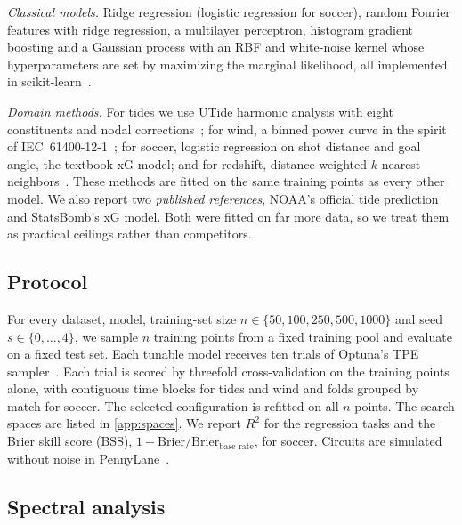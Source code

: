 \documentclass[11pt,letterpaper]{article}
\begin{document}
\emph{Classical models.} Ridge regression (logistic regression for soccer), random Fourier
features with ridge regression, a multilayer perceptron, histogram gradient boosting and a
Gaussian process with an RBF and white-noise kernel whose hyperparameters are set by maximizing
the marginal likelihood, all implemented in scikit-learn~\cite{pedregosa2011sklearn}.

\emph{Domain methods.} For tides we use UTide harmonic analysis with eight constituents and
nodal corrections~\cite{codiga2011utide}; for wind, a binned power curve in the spirit of
IEC~61400-12-1~\cite{iec61400}; for soccer, logistic regression on shot distance and goal
angle, the textbook xG model; and for redshift, distance-weighted $k$-nearest
neighbors~\cite{beck2016photoz}. These methods are fitted on the same training points as every
other model. We also report two \emph{published references}, NOAA's official tide prediction
and StatsBomb's xG model. Both were fitted on far more data, so we treat them as practical
ceilings rather than competitors.

\subsection{Protocol}

For every dataset, model, training-set size $n\in\{50,100,250,500,1000\}$ and seed
$s\in\{0,\dots,4\}$, we sample $n$ training points from a fixed training pool and evaluate on a
fixed test set. Each tunable model receives ten trials of Optuna's TPE
sampler~\cite{akiba2019optuna}. Each trial is scored by threefold cross-validation on the
training points alone, with contiguous time blocks for tides and wind and folds grouped by
match for soccer. The selected configuration is refitted on all $n$ points. The search spaces
are listed in \cref{app:spaces}. We report $R^2$ for the regression tasks and the Brier skill
score (BSS), $1-\mathrm{Brier}/\mathrm{Brier}_{\text{base rate}}$, for soccer. Circuits are
simulated without noise in PennyLane~\cite{bergholm2018pennylane}.

\subsection{Spectral analysis}
\label{sec:spectral}
\end{document}
